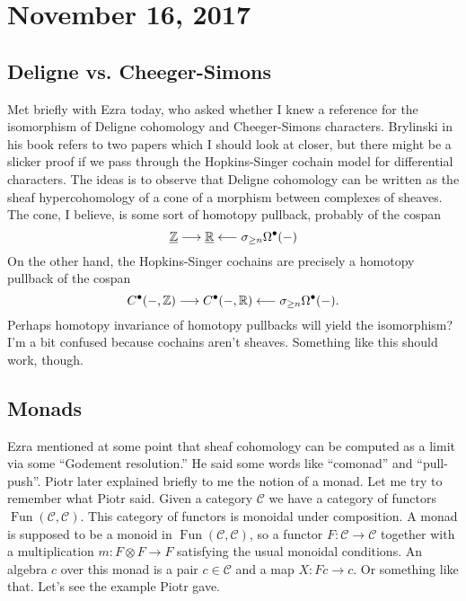 \documentclass{amsart}
\DeclareMathOperator{\Fun}{Fun}
\begin{document}
\section{November 16, 2017}

\subsection{Deligne vs. Cheeger-Simons}

Met briefly with Ezra today, who asked whether I knew a reference for the
isomorphism of Deligne cohomology and Cheeger-Simons characters. Brylinski
in his book refers to two papers which I should look at closer, but there
might be a slicker proof if we pass through the Hopkins-Singer cochain model
for differential characters. The ideas is to observe that Deligne cohomology
can be written as the sheaf hypercohomology of a cone of a morphism between
complexes of sheaves. The cone, I believe, is some sort of homotopy pullback,
probably of the cospan
\begin{equation*}
    \underline{\mathbb{Z}} \longrightarrow \underline{\mathbb{R}} \longleftarrow \sigma_{\geq n}\Omega^\bullet(-)
\end{equation*}
On the other hand, the Hopkins-Singer cochains are precisely a homotopy
pullback of the cospan
\begin{equation*}
    C^\bullet(-,\mathbb{Z}) \longrightarrow C^\bullet(-,\mathbb{R}) \longleftarrow \sigma_{\geq n}\Omega^\bullet(-).
\end{equation*}
Perhaps homotopy invariance of homotopy pullbacks will yield the isomorphism?
I'm a bit confused because cochains aren't sheaves. Something like this should
work, though.

\subsection{Monads}

Ezra mentioned at some point that sheaf cohomology can be computed as a limit
via some ``Godement resolution.'' He said some words like ``comonad'' and ``pull-push''.
Piotr later explained briefly to me the notion of a monad. Let me try to remember what Piotr
said. Given a category $\mathcal{C}$ we have a category of functors $\Fun(\mathcal{C},\mathcal{C})$.
This category of functors is monoidal under composition. A monad is supposed
to be a monoid in $\Fun(\mathcal{C},\mathcal{C})$, so a functor $F:\mathcal{C}\to \mathcal{C}$
together with a multiplication $m:F\otimes F\to F$ satisfying the usual monoidal
conditions. An algebra $c$ over this monad is a pair $c\in \mathcal{C}$ and a
map $X:Fc\to c$. Or something like that. Let's see the example Piotr gave.
\end{document}
